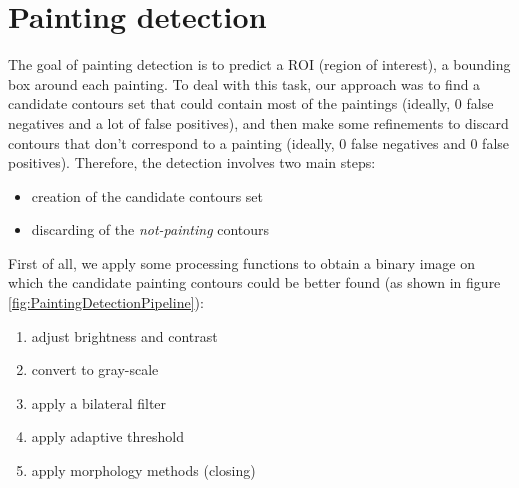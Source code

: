 \documentclass[10pt,twocolumn,letterpaper]{article}
\begin{document}
\section{Painting detection}
\label{sec:PaintingDetection}
The goal of painting detection is to predict a ROI (region of interest), \ie a bounding box around each painting.
To deal with this task, our approach was to find a candidate contours set that could contain most of the paintings (ideally, 0 false negatives and a lot of false positives), and then make some refinements to discard contours that don't correspond to a painting (ideally, 0 false negatives and 0 false positives).
Therefore, the detection involves two main steps:
\begin{itemize}
\item creation of the candidate contours set
\item discarding of the \textit{not-painting} contours
\end{itemize}

First of all, we apply some processing functions to obtain a binary image on which the candidate painting contours could be better found (as shown in figure \ref{fig:PaintingDetectionPipeline}):
\begin{enumerate}
    \item adjust brightness and contrast
    \item convert to gray-scale
    \item apply a bilateral filter
    \item apply adaptive threshold
    \item apply morphology methods (closing)
\end{enumerate}
\end{document}
